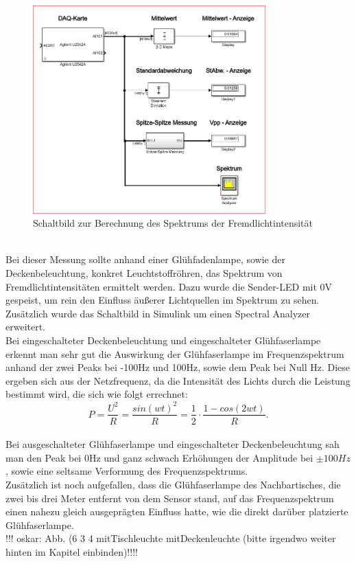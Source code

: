 \begin{figure}[h]
	\centering
	\includegraphics[width=0.8\textwidth]{./img/6_3_4}
	\caption{Schaltbild zur Berechnung des Spektrums der Fremdlichtintensität}
	\label{fg:schalt_spek}
\end{figure}
~\\
Bei dieser Messung sollte anhand einer Glühfadenlampe, sowie der Deckenbeleuchtung, konkret Leuchtstoffröhren, das Spektrum von Fremdlichtintensitäten ermittelt werden. Dazu wurde die Sender-LED mit 0V gespeist, um rein den Einfluss äußerer Lichtquellen im Spektrum zu sehen. Zusätzlich wurde das Schaltbild in Simulink um einen Spectral Analyzer erweitert.
~\\
Bei eingeschalteter Deckenbeleuchtung und eingeschalteter Glühfaserlampe erkennt man sehr gut die Auswirkung der Glühfaserlampe im Frequenzspektrum anhand der zwei Peaks bei -100Hz und 100Hz, sowie dem Peak bei Null Hz. Diese ergeben sich aus der Netzfrequenz, da die Intensität des Lichts durch die Leistung bestimmt wird, die sich wie folgt errechnet:
\begin{equation}
	 P = \dfrac{U^2}{R} = \dfrac{sin(wt)^2}{R} = \dfrac{1}{2} \cdot \dfrac{1 - cos(2wt)}{R}.
\end{equation}
~\\
Bei ausgeschalteter Glühfaserlampe und eingeschalteter Deckenbeleuchtung sah man den Peak bei 0Hz und ganz schwach Erhöhungen der Amplitude bei $\pm 100Hz$, sowie eine seltsame Verformung des Frequenzspektrums.
~\\
Zusätzlich ist noch aufgefallen, dass die Glühfaserlampe des Nachbartisches, die zwei bis drei Meter entfernt von dem Sensor stand, auf das Frequenzspektrum einen nahezu gleich ausgeprägten Einfluss hatte, wie die direkt darüber platzierte Glühfaserlampe.
~\\
!!! oskar: Abb. (6 3 4 mitTischleuchte mitDeckenleuchte (bitte irgendwo weiter hinten im Kapitel einbinden)!!!!
~\\
